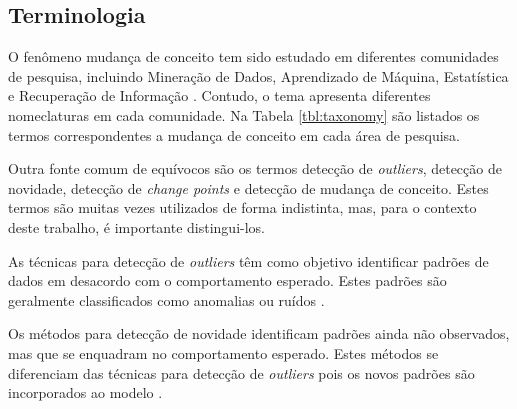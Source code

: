 \documentclass[msc, classic, a4paper]{ufbathesis}
\begin{document}
\subsection{Terminologia}

O fenômeno mudança de conceito tem sido estudado em diferentes comunidades de pesquisa, incluindo Mineração de Dados,
Aprendizado de Máquina, Estatística e Recuperação de Informação \cite{Zliobaite:2010}.
Contudo, o tema apresenta diferentes nomeclaturas em cada comunidade.
Na Tabela \ref{tbl:taxonomy} são listados os termos correspondentes a mudança de conceito em cada área de pesquisa.

\begin{table}[!ht]
    \caption{Terminologia - Mudança de Conceito \cite{Zliobaite:2010}}
    \label{tbl:taxonomy}
    \centering
\end{table}

Outra fonte comum de equívocos são os termos detecção de \textit{outliers}, detecção de novidade, detecção de \textit{change points} e detecção de mudança de conceito.
Estes termos são muitas vezes utilizados de forma indistinta, mas, para o contexto deste trabalho, é importante distingui-los.

As técnicas para detecção de \textit{outliers} têm como objetivo identificar padrões de dados em desacordo com o comportamento esperado. Estes padrões são geralmente classificados como anomalias ou ruídos \cite{Chandola:2009:ADS:1541880.1541882}.

Os métodos para detecção de novidade identificam padrões ainda não observados, mas que se enquadram no comportamento esperado.
Estes métodos se diferenciam das técnicas para detecção de \textit{outliers} pois os novos padrões são incorporados ao modelo \cite{Chandola:2009:ADS:1541880.1541882}.
\end{document}
